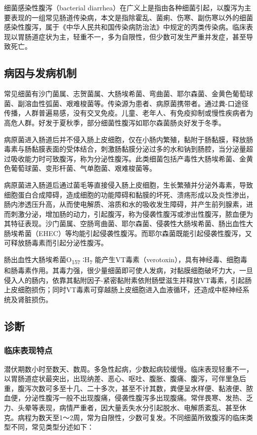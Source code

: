 细菌感染性腹泻（bacterial
diarrhea）在广义上是指由各种细菌引起，以腹泻为主要表现的一组常见肠道传染病，本文是指除霍乱、菌痢、伤寒、副伤寒以外的细菌感染性腹泻，属于《中华人民共和国传染病防治法》中规定的丙类传染病。临床表现以胃肠道症状为主，轻重不一，多为自限性，但少数可发生严重并发症，甚至导致死亡。

\subsection{病因与发病机制}

常见细菌有沙门菌属、志贺菌属、大肠埃希菌、弯曲菌、耶尔森菌、金黄色葡萄球菌、副溶血性弧菌、艰难梭菌等。传染源为患者、病原菌携带者。通过粪-口途径传播，人群普遍易感，没有交叉免疫。儿童、老年人、有免疫抑制或慢性疾病者为高危人群。好发于夏秋季，部分细菌性腹泻如耶尔森菌肠炎好发于冬季。

病原菌进入肠道后并不侵入肠上皮细胞，仅在小肠内繁殖，黏附于肠黏膜，释放肠毒素与肠黏膜表面的受体结合，刺激肠黏膜分泌过多的水和钠到肠腔，当分泌量超过吸收能力时可致腹泻，称为分泌性腹泻。此类细菌包括产毒性大肠埃希菌、金黄色葡萄球菌、变形杆菌、气单胞菌、艰难梭菌等。

病原菌进入肠道后通过菌毛等直接侵入肠上皮细胞，生长繁殖并分泌外毒素，导致细胞蛋白合成障碍，造成细胞的功能障碍和黏膜的坏死、溃疡形成以及炎性渗出，肠内渗透压升高，从而使电解质、溶质和水的吸收发生障碍，并产生前列腺素，进而刺激分泌，增加肠的动力，引起腹泻，称为侵袭性腹泻或渗出性腹泻，脓血便为其特征表现。沙门菌属、空肠弯曲菌、耶尔森菌、侵袭性大肠埃希菌、肠出血性大肠埃希菌（EHEC）等均能引起侵袭性腹泻。而耶尔森菌既能引起侵袭性腹泻，又可释放肠毒素而引起分泌性腹泻。

肠出血性大肠埃希菌O\textsubscript{157} ∶H\textsubscript{7}
能产生VT毒素（verotoxin），具有神经毒、细胞毒和肠毒素作用。其毒力强，很少量细菌即可使人发病，对黏膜细胞破坏力大，一旦侵入人的肠内，依靠其黏附因子-紧密黏附素依附肠壁滋生并释放VT毒素，引起肠上皮细胞损伤；同时VT毒素可穿越肠上皮细胞进入血液循环，还造成中枢神经系统及肾脏损伤。

\subsection{诊断}

\subsubsection{临床表现特点}

潜伏期数小时至数天、数周。多急性起病，少数起病较缓慢。临床表现轻重不一，以胃肠道症状最突出，出现纳差、恶心、呕吐、腹胀、腹痛、腹泻，可伴里急后重，腹泻次数可多至十几、二十多次，甚至不计其数，粪便呈水样便、黏液便、脓血便，分泌性腹泻一般不出现腹痛，侵袭性腹泻多出现腹痛。常伴畏寒、发热、乏力、头晕等表现，病情严重者，因大量丢失水分引起脱水、电解质紊乱、甚至休克。病程为数天至1～2周，常为自限性，少数可复发。不同细菌所致腹泻的临床类型不同，常见类型分述如下：

